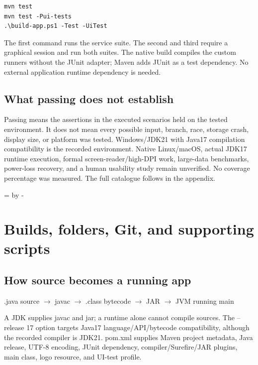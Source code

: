 \documentclass[12pt]{article}
\newcommand{\topic}[1]{\needroom{9\baselineskip}\section{#1}}
\newcommand{\needroom}[1]{\par\begingroup\dimen0=\pagegoal\advance\dimen0 by -\pagetotal\ifdim\dimen0<#1\newpage\fi\endgroup}
\begin{document}
\begin{verbatim}
mvn test
mvn test -Pui-tests
.\build-app.ps1 -Test -UiTest
\end{verbatim}
The first command runs the service suite. The second and third require a graphical session and run both suites. The native build compiles the custom runners without the JUnit adapter; Maven adds JUnit as a test dependency. No external application runtime dependency is needed.

\subsection{What passing does not establish}
Passing means the assertions in the executed scenarios held on the tested environment. It does not mean every possible input, branch, race, storage crash, display size, or platform was tested. Windows/JDK21 with Java17 compilation compatibility is the recorded environment. Native Linux/macOS, actual JDK17 runtime execution, formal screen-reader/high-DPI work, large-data benchmarks, power-loss recovery, and a human usability study remain unverified. No coverage percentage was measured. The full catalogue follows in the appendix.

\topic{Builds, folders, Git, and supporting scripts}
\subsection{How source becomes a running app}
\begin{center}\small
.java source $\rightarrow$ javac $\rightarrow$ .class bytecode $\rightarrow$ JAR $\rightarrow$ JVM running main
\end{center}
A JDK supplies javac and jar; a runtime alone cannot compile sources. The --release 17 option targets Java17 language/API/bytecode compatibility, although the recorded compiler is JDK21. pom.xml supplies Maven project metadata, Java release, UTF-8 encoding, JUnit dependency, compiler/Surefire/JAR plugins, main class, logo resource, and UI-test profile.
\end{document}
